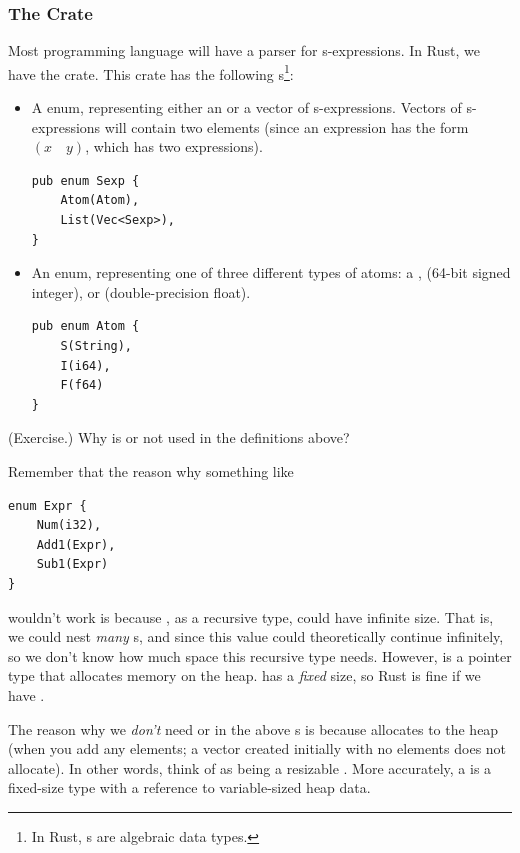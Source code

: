 \subsubsection{The  Crate}
Most programming language will have a parser for s-expressions. In Rust, we have the  crate. This crate has the following s\footnote{In Rust, s are algebraic data types.}:
\begin{itemize}
    \item A  enum, representing either an  or a vector of s-expressions. Vectors of s-expressions will contain two elements (since an expression has the form $(x \quad y)$, which has two expressions). 
    \begin{verbatim}
pub enum Sexp {
    Atom(Atom),
    List(Vec<Sexp>),
}
    \end{verbatim}

    \item An  enum, representing one of three different types of atoms: a ,  (64-bit signed integer), or  (double-precision float). 
    \begin{verbatim}
pub enum Atom {
    S(String),
    I(i64),
    F(f64)
}\end{verbatim}
\end{itemize}

\begin{mdframed}
    (Exercise.) Why is  or  not used in the  definitions above? 

    \begin{mdframed}
        Remember that the reason why something like 
        \begin{verbatim}
enum Expr {
    Num(i32),
    Add1(Expr),
    Sub1(Expr)
}\end{verbatim}
        wouldn't work is because , as a recursive type, could have infinite size. That is, we could nest \emph{many} s, and since this value could theoretically continue infinitely, so we don't know how much space this recursive type needs. However,  is a pointer type that allocates memory on the heap.  has a \emph{fixed} size, so Rust is fine if we have . 

        \bigskip

        The reason why we \emph{don't} need  or  in the above s is because  allocates to the heap (when you add any elements; a vector created initially with no elements does not allocate). In other words, think of  as being a resizable . More accurately, a  is a fixed-size type with a reference to variable-sized heap data.
    \end{mdframed}
\end{mdframed}


